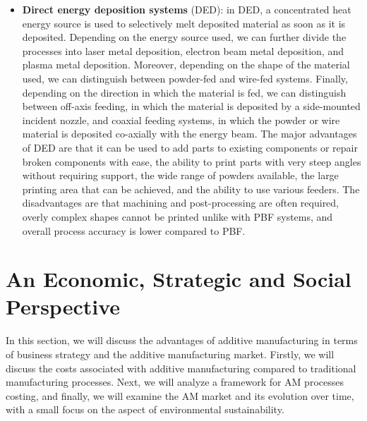 \begin{itemize}
    \item \textbf{Direct energy deposition systems} (DED): in DED, a concentrated heat energy source is used to selectively melt deposited material as soon as it is deposited. Depending on the energy source used, we can further divide the processes into laser metal deposition, electron beam metal deposition, and plasma metal deposition. Moreover, depending on the shape of the material used, we can distinguish between powder-fed and wire-fed systems. Finally, depending on the direction in which the material is fed, we can distinguish between off-axis feeding, in which the material is deposited by a side-mounted incident nozzle, and coaxial feeding systems, in which the powder or wire material is deposited co-axially with the energy beam. The major advantages of DED are that it can be used to add parts to existing components or repair broken components with ease, the ability to print parts with very steep angles without requiring support, the wide range of powders available, the large printing area that can be achieved, and the ability to use various feeders. The disadvantages are that machining and post-processing are often required, overly complex shapes cannot be printed unlike with PBF systems, and overall process accuracy is lower compared to PBF.
    
\end{itemize}

\section{An Economic, Strategic and Social Perspective} \label{sec:economic_strategic_social}
In this section, we will discuss the advantages of additive manufacturing in terms of business strategy and the additive manufacturing market. Firstly, we will discuss the costs associated with additive manufacturing compared to traditional manufacturing processes. Next, we will analyze a framework for AM processes costing, and finally, we will examine the AM market and its evolution over time, with a small focus on the aspect of environmental sustainability. 



